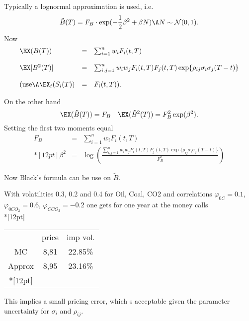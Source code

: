 	Typically a lognormal approximation is used, i.e.
	$$
	\tilde{B}(T)=F_B\cdot\exp(-\frac{1}{2}\beta^2+\beta N)\A
	N\sim{\cal N}(0,1).$$
	Now
	$$\begin{array}{lll}
		\EX(B(T)) & = & \sum_{i=1}^nw_iF_i(t,T) \\*[12pt]
		\EX[B^2(T)] & = & \sum_{i,j=1}^nw_iw_jF_i(t,T)F_j(t,T) \exp\{\rho_{ij} \sigma_i\sigma_j(T-t)\}
		\\*[12pt]
	 (\mbox{use}\A \EX_t(S_i(T)) & = & F_i(t,T)).
	\end{array}$$

	On the other hand
	$$\EX(\tilde{B}(T))=F_B\quad\EX(\tilde{B}^2(T))=F_B^2\exp(\beta^2).$$
	Setting the first two moments equal
	$$\begin{array}{lll}
		F_B & = & \sum_{i=1}^nw_iF_i(t,T) \\*[12pt]
	 \beta^2 & = & \log\left(\frac{\sum_{i,j=1}^nw_iw_jF_i(t,T)F_j(t,T)\exp\{\rho_{ij}\sigma_i\sigma_j(T-t)\}}{F_B^2}\right)
	\end{array}$$

	Now Black's formula can be use on $\tilde{B}$.

	With volatilities 0.3, 0.2 and 0.4 for
	Oil, Coal, CO2 and correlations $\varphi_{0C}=0.1$,
	$\varphi_{0CO_2}=0.6$, $\varphi_{CCO_2}=-0.2$ one gets for one year
	at the money calls\\*[12pt]

	\begin{tabular}{ccc}

		 & price& imp vol. \\
	 MC & 8,81 & 22.85\% \\
		Approx & 8,95 & 23.16\% \\*[12pt]
	\end{tabular}

	This implies a small pricing error, which s acceptable given the parameter uncertainty for $\sigma_i$ and $\rho_{ij}$.
	










